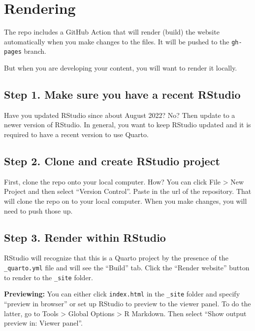 \documentclass[
  letterpaper,
  oneside,
  open=any]{scrbook}
\begin{document}

\chapter{Rendering}\label{rendering}

The repo includes a GitHub Action that will render (build) the website
automatically when you make changes to the files. It will be pushed to
the \texttt{gh-pages} branch.

But when you are developing your content, you will want to render it
locally.

\section{Step 1. Make sure you have a recent
RStudio}\label{step-1.-make-sure-you-have-a-recent-rstudio}

Have you updated RStudio since about August 2022? No? Then update to a
newer version of RStudio. In general, you want to keep RStudio updated
and it is required to have a recent version to use Quarto.

\section{Step 2. Clone and create RStudio
project}\label{step-2.-clone-and-create-rstudio-project}

First, clone the repo onto your local computer. How? You can click File
\textgreater{} New Project and then select ``Version Control''. Paste in
the url of the repository. That will clone the repo on to your local
computer. When you make changes, you will need to push those up.

\section{Step 3. Render within
RStudio}\label{step-3.-render-within-rstudio}

RStudio will recognize that this is a Quarto project by the presence of
the \texttt{\_quarto.yml} file and will see the ``Build'' tab. Click the
``Render website'' button to render to the \texttt{\_site} folder.

\textbf{Previewing:} You can either click \texttt{index.html} in the
\texttt{\_site} folder and specify ``preview in browser'' or set up
RStudio to preview to the viewer panel. To do the latter, go to Tools
\textgreater{} Global Options \textgreater{} R Markdown. Then select
``Show output preview in: Viewer panel''.
\end{document}
